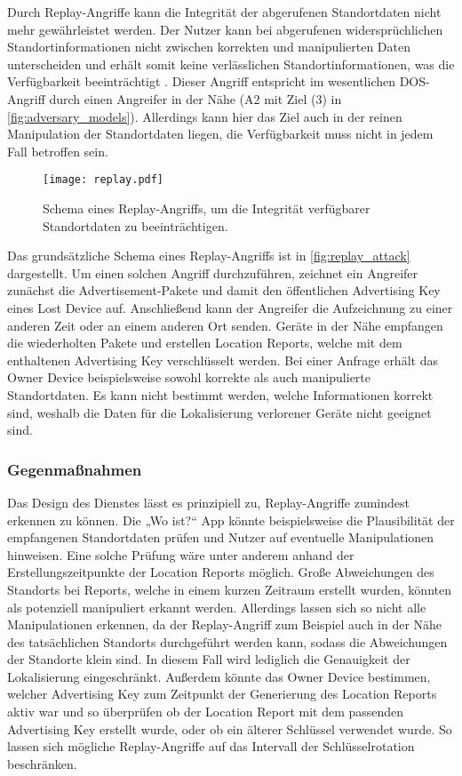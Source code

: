 Durch Replay-Angriffe kann die Integrität der abgerufenen Standortdaten nicht mehr gewährleistet werden.
Der Nutzer kann bei abgerufenen widersprüchlichen Standortinformationen nicht zwischen korrekten und manipulierten Daten unterscheiden und erhält somit keine verlässlichen Standortinformationen, was die Verfügbarkeit beeinträchtigt \cite{Heinrich_FindMy}.
Dieser Angriff entspricht im wesentlichen \ac{DOS}-Angriff durch einen Angreifer in der Nähe (A2 mit Ziel (3) in \autoref{fig:adversary_models}).
Allerdings kann hier das Ziel auch in der reinen Manipulation der Standortdaten liegen, die Verfügbarkeit muss nicht in jedem Fall betroffen sein.
\begin{figure}[ht]
    \centering
    \texttt{[image: replay.pdf]}
    \caption{Schema eines Replay-Angriffs, um die Integrität verfügbarer Standortdaten zu beeinträchtigen.}
    \label{fig:replay_attack}  
\end{figure}

Das grundsätzliche Schema eines Replay-Angriffs ist in \autoref{fig:replay_attack} dargestellt.
Um einen solchen Angriff durchzuführen, zeichnet ein Angreifer zunächst die Advertisement-Pakete und damit den öffentlichen Advertising Key eines Lost Device auf.
Anschließend kann der Angreifer die Aufzeichnung zu einer anderen Zeit oder an einem anderen Ort senden.
Geräte in der Nähe empfangen die wiederholten Pakete und erstellen Location Reports, welche mit dem enthaltenen Advertising Key verschlüsselt werden.
Bei einer Anfrage erhält das Owner Device beispielsweise sowohl korrekte als auch manipulierte Standortdaten.
Es kann nicht bestimmt werden, welche Informationen korrekt sind, weshalb die Daten für die Lokalisierung verlorener Geräte nicht geeignet sind.

\subsubsection{Gegenmaßnahmen}
Das Design des Dienstes lässt es prinzipiell zu, Replay-Angriffe zumindest erkennen zu können.
Die „Wo ist?“ App könnte beispielsweise die Plausibilität der empfangenen Standortdaten prüfen und Nutzer auf eventuelle Manipulationen hinweisen.
Eine solche Prüfung wäre unter anderem anhand der Erstellungszeitpunkte der Location Reports möglich.
Große Abweichungen des Standorts bei Reports, welche in einem kurzen Zeitraum erstellt wurden, könnten als potenziell manipuliert erkannt werden.
Allerdings lassen sich so nicht alle Manipulationen erkennen, da der Replay-Angriff zum Beispiel auch in der Nähe des tatsächlichen Standorts durchgeführt werden kann, sodass die Abweichungen der Standorte klein sind.
In diesem Fall wird lediglich die Genauigkeit der Lokalisierung eingeschränkt.
Außerdem könnte das Owner Device bestimmen, welcher Advertising Key zum Zeitpunkt der Generierung des Location Reports aktiv war und so überprüfen ob der Location Report mit dem passenden Advertising Key erstellt wurde, oder ob ein älterer Schlüssel verwendet wurde.
So lassen sich mögliche Replay-Angriffe auf das Intervall der Schlüsselrotation beschränken.

